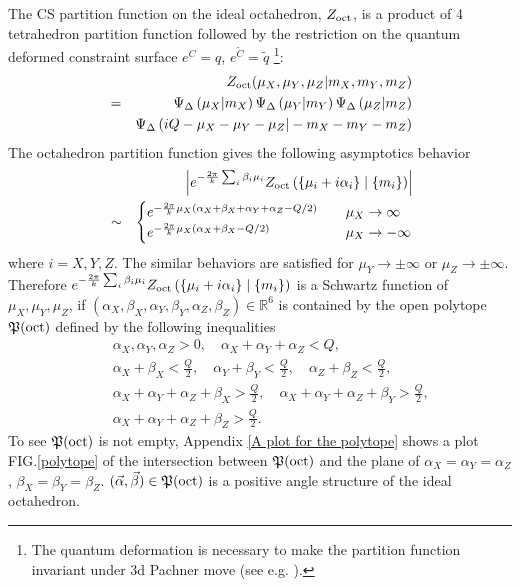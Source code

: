 \documentclass[aps,prd,notitlepage,nofootinbib,superscriptaddress,groupedaddress,twocolumn]{revtex4-1}
\def\R{\mathbb{R}}
\def\be{\begin{eqnarray}}
\def\ee{\end{eqnarray}}
\renewcommand{\a}{\alpha}
\renewcommand{\b}{\beta}
\newcommand{\eps}{\varepsilon}
\newcommand{\lt}{\left}
\newcommand{\rt}{\right}
\begin{document}
The CS partition function on the ideal octahedron, $Z_{\rm oct}$, is a product of 4 tetrahedron partition function %
followed by the restriction on the quantum deformed constraint surface $e^C=q$, $e^{\widetilde{C}}=\widetilde{q}$ \footnote{The quantum deformation is necessary to make the partition function invariant under 3d Pachner move (see e.g. \cite{Dimofte2011}).}:  
\be
&&Z_{\rm oct}(\mu_{X},\mu_{Y},\mu_{Z}|m_{X},m_{Y},m_{Z})\nonumber\\
&=&\Psi_\Delta \left(\mu_{X}|m_{X}\right) \Psi_\Delta \left(\mu_{Y}|m_{Y}\right) \Psi_\Delta \left(\mu_{Z}|m_{Z}\right)\nonumber\\
&& \Psi_\Delta \left(i Q-\mu_{X}-\mu_{Y}-\mu_{Z}|-m_{X}-m_{Y}-m_{Z}\right)\nonumber
\ee
The octahedron partition function gives the following asymptotics behavior
\be
&&\lt|e^{-\frac{2\pi}{k}\sum_{i}\b_{i}\mu_{i}}Z_{\rm oct}\lt(\{\mu_{i}+i\a_{i}\}\mid\{m_{i}\}\rt)\rt|\nonumber\\
&\sim&\begin{cases}
e^{ -\frac{2 \pi}{k}\mu_{X}\lt(\a_{X}+\b_{X}+\a_{Y}+\a_{Z}-{Q} / 2\rt)} \quad & \mu_{X}\to\infty\\
e^{-\frac{2\pi}{k}\mu_{X}\lt(\a_{X}+\b_{X}-Q/2\rt)} \quad & \mu_{X}\to-\infty
\end{cases}\nonumber
\ee
where $i=X,Y,Z$. The similar behaviors are satisfied for $\mu_{Y}\to\pm\infty$ or $\mu_{Z}\to\pm\infty$. Therefore $e^{-\frac{2\pi}{k}\sum_{i}\b_{i}\mu_{i}}Z_{\rm oct}\lt(\{\mu_{i}+i\a_{i}\}\mid\{m_{i}\}\rt)$ is a Schwartz function of $\mu_X,\mu_Y,\mu_Z$, if $(\a_{X},\b_{X},\a_{Y},\b_{Y},\a_{Z},\b_{Z})\in\R^6$ is contained by the open polytope $\mathfrak{P}(\mathrm{oct})$ defined by the following inequalities
\be
&&\a_{X},\a_{Y},\a_{Z}>0,\quad \a_X+\a_Y+\a_Z<Q,\nonumber\\
&&\a_{X}+\b_{X}<\frac{Q}{2},\quad \a_{Y}+\b_{Y}<\frac{Q}{2},\quad \a_{Z}+\b_{Z}<\frac{Q}{2}, \nonumber\\
&& \a_{X}+\a_{Y}+\a_Z+\b_X>\frac{Q}{2},\quad \a_{X}+\a_{Y}+\a_Z+\b_Y>\frac{Q}{2},\nonumber\\
&&\a_{X}+\a_{Y}+\a_Z+\b_Z>\frac{Q}{2}.\label{octinequality}
\ee 
To see $\mathfrak{P}(\mathrm{oct})$ is not empty, Appendix \ref{A plot for the polytope} shows a plot FIG.\ref{polytope} of the intersection between $\mathfrak{P}(\mathrm{oct})$ and the plane of $\a_X=\a_Y=\a_Z$, $\b_X=\b_Y=\b_Z$. $(\vec{\a},\vec{\b})\in \Fp({\rm oct})$ is a positive angle structure of the ideal octahedron. 
\end{document}
